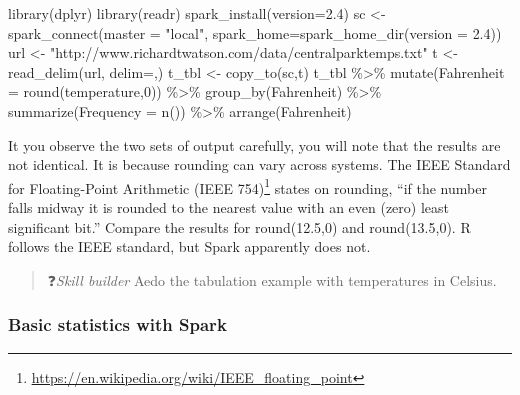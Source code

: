 \documentclass[
]{article}
\newenvironment{Shaded}{\begin{snugshade}}{\end{snugshade}}
\newcommand{\AttributeTok}[1]{\textcolor[rgb]{0.77,0.63,0.00}{#1}}
\newcommand{\DecValTok}[1]{\textcolor[rgb]{0.00,0.00,0.81}{#1}}
\newcommand{\FunctionTok}[1]{\textcolor[rgb]{0.00,0.00,0.00}{#1}}
\newcommand{\NormalTok}[1]{#1}
\newcommand{\OtherTok}[1]{\textcolor[rgb]{0.56,0.35,0.01}{#1}}
\newcommand{\SpecialCharTok}[1]{\textcolor[rgb]{0.00,0.00,0.00}{#1}}
\newcommand{\StringTok}[1]{\textcolor[rgb]{0.31,0.60,0.02}{#1}}
\begin{document}
\begin{Shaded}
\begin{Highlighting}[]
\FunctionTok{library}\NormalTok{(dplyr)}
\FunctionTok{library}\NormalTok{(readr)}
\FunctionTok{spark\_install}\NormalTok{(}\AttributeTok{version=}\StringTok{\textquotesingle{}2.4\textquotesingle{}}\NormalTok{)}
\NormalTok{sc }\OtherTok{\textless{}{-}} \FunctionTok{spark\_connect}\NormalTok{(}\AttributeTok{master =} \StringTok{"local"}\NormalTok{, }\AttributeTok{spark\_home=}\FunctionTok{spark\_home\_dir}\NormalTok{(}\AttributeTok{version =} \StringTok{\textquotesingle{}2.4\textquotesingle{}}\NormalTok{))}
\NormalTok{url }\OtherTok{\textless{}{-}}  \StringTok{"http://www.richardtwatson.com/data/centralparktemps.txt"}
\NormalTok{t }\OtherTok{\textless{}{-}} \FunctionTok{read\_delim}\NormalTok{(url, }\AttributeTok{delim=}\StringTok{\textquotesingle{},\textquotesingle{}}\NormalTok{)}
\NormalTok{t\_tbl }\OtherTok{\textless{}{-}} \FunctionTok{copy\_to}\NormalTok{(sc,t)}
\NormalTok{t\_tbl }\SpecialCharTok{\%\textgreater{}\%} 
  \FunctionTok{mutate}\NormalTok{(}\AttributeTok{Fahrenheit =} \FunctionTok{round}\NormalTok{(temperature,}\DecValTok{0}\NormalTok{)) }\SpecialCharTok{\%\textgreater{}\%} 
  \FunctionTok{group\_by}\NormalTok{(Fahrenheit) }\SpecialCharTok{\%\textgreater{}\%}
  \FunctionTok{summarize}\NormalTok{(}\AttributeTok{Frequency =} \FunctionTok{n}\NormalTok{()) }\SpecialCharTok{\%\textgreater{}\%}
  \FunctionTok{arrange}\NormalTok{(Fahrenheit)}
\end{Highlighting}
\end{Shaded}

It you observe the two sets of output carefully, you will note that the
results are not identical. It is because rounding can vary across
systems. The IEEE Standard for Floating-Point Arithmetic (IEEE
754)\footnote{\href{https://en.wikipedia.org/wiki/IEEE_floating_point}{\underline{https://en.wikipedia.org/wiki/IEEE\_floating\_point}}} states on rounding, ``if the number falls
midway it is rounded to the nearest value with an even (zero) least
significant bit.'' Compare the results for round(12.5,0) and
round(13.5,0). R follows the IEEE standard, but Spark apparently does
not.

\begin{quote}
❓\emph{Skill builder} Aedo the tabulation example with temperatures in
Celsius.
\end{quote}

\hypertarget{basic-statistics-with-spark}{%
\subsubsection*{Basic statistics with Spark}\label{basic-statistics-with-spark}}
\end{document}
